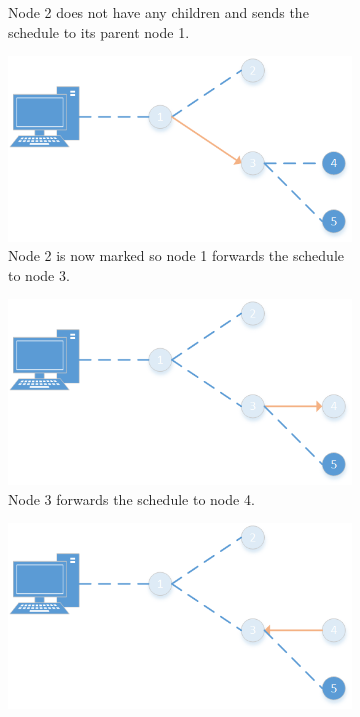 \begin{figure}[htbp]
\begin{subfigure}[t]{0.4\textwidth}
        \caption{Node 2 does not have any children and sends the schedule to its parent node 1.}
        \label{fig:spreading3}
    \end{subfigure}
    \quad
    \quad
    \begin{subfigure}[t]{0.4\textwidth}
		\centering         
        \includegraphics[scale=0.6]{content/images/ScheduleSpreading/Part4}
        \caption{Node 2 is now marked so node 1 forwards the schedule to node 3.}
        \label{fig:spreading4}
    \end{subfigure}
    \quad
    \quad
    \begin{subfigure}[t]{0.4\textwidth}
		\centering         
        \includegraphics[scale=0.6]{content/images/ScheduleSpreading/Part5}
        \caption{Node 3 forwards the schedule to node 4.}
        \label{fig:spreading5}
    \end{subfigure}
    \quad
    \quad
    \begin{subfigure}[t]{0.4\textwidth}
		\centering         
        \includegraphics[scale=0.6]{content/images/ScheduleSpreading/Part6}

\end{subfigure}
\end{figure}
